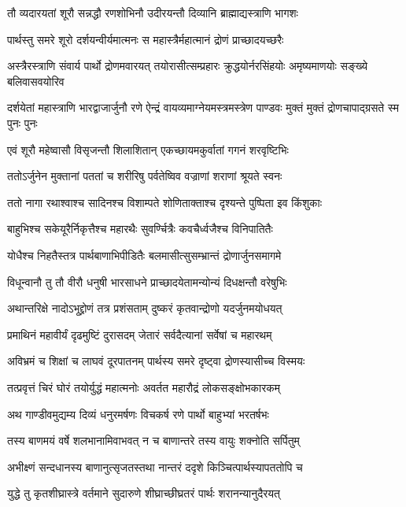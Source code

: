 \twolineshloka
{तौ व्यदारयतां शूरौ सन्नद्धौ रणशोभिनौ}
{उदीरयन्तौ दिव्यानि ब्राह्माद्यस्त्राणि भागशः}


\twolineshloka
{पार्थस्तु समरे शूरो दर्शयन्वीर्यमात्मनः}
{स महास्त्रैर्महात्मानं द्रोणं प्राच्छादयच्छरैः}


\onelineshloka
{अस्त्रैरस्त्राणि संवार्य पार्थो द्रोणमवारयत्}
\twolineshloka
{तयोरासीत्सम्प्रहारः क्रुद्धयोर्नरसिंहयोः}
{अमृष्यमाणयोः सङ्ख्ये बलिवासवयोरिव}


\onelineshloka
{दर्शयेतां महास्त्राणि भारद्वाजार्जुनौ रणे}
\twolineshloka
{ऐन्द्रं वायव्यमाग्नेयमस्त्रमस्त्रेण पाण्डवः}
{मुक्तं मुक्तं द्रोणचापाद्ग्रसते स्म पुनः पुनः}


\twolineshloka
{एवं शूरौ महेष्वासौ विसृजन्तौ शिलाशितान्}
{एकच्छायमकुर्वातां गगनं शरवृष्टिभिः}


\twolineshloka
{ततोऽर्जुनेन मुक्तानां पततां च शरीरिषु}
{पर्वतेष्विव वज्राणां शराणां श्रूयते स्वनः}


\twolineshloka
{ततो नागा रथाश्वाश्च सादिनश्च विशाम्पते}
{शोणिताक्ताश्च दृश्यन्ते पुष्पिता इव किंशुकाः}


\twolineshloka
{बाहुभिश्च सकेयूरैर्निकृत्तैश्च महारथैः}
{सुवर्ण्चित्रैः कवचैर्ध्वजैश्च विनिपातितैः}


\twolineshloka
{योधैश्च निहतैस्तत्र पार्थबाणाभिपीडितैः}
{बलमासीत्सुसम्भ्रान्तं द्रोणार्जुनसमागमे}


\twolineshloka
{विधून्वानौ तु तौ वीरौ धनुषी भारसाधने}
{प्राच्छादयेतामन्योन्यं दिधक्षन्तौ वरेषुभिः}


\twolineshloka
{अथान्तरिक्षे नादोऽभूद्द्रोणं तत्र प्रशंसताम्}
{दुष्करं कृतवान्द्रोणो यदर्जुनमयोधयत्}


\twolineshloka
{प्रमाथिनं महावीर्यं दृढमुष्टिं दुरासदम्}
{जेतारं सर्वदैत्यानां सर्वेषां च महारथम्}


\twolineshloka
{अविभ्रमं च शिक्षां च लाघवं दूरपातनम्}
{पार्थस्य समरे दृष्ट्वा द्रोणस्यासीच्च विस्मयः}


\twolineshloka
{तत्प्रवृत्तं चिरं घोरं तयोर्युद्धं महात्मनोः}
{अवर्तत महारौद्रं लोकसङ्क्षोभकारकम्}


\twolineshloka
{अथ गाण्डीवमुद्यम्य दिव्यं धनुरमर्षणः}
{विचकर्ष रणे पार्थो बाहुभ्यां भरतर्षभः}


\twolineshloka
{तस्य बाणमयं वर्षे शलभानामिवाभवत्}
{न च बाणान्तरे तस्य वायुः शक्नोति सर्पितुम्}


\twolineshloka
{अभीक्ष्णं सन्दधानस्य बाणानुत्सृजतस्तथा}
{नान्तरं ददृशे किञ्चित्पार्थस्यापततोपि च}


\twolineshloka
{युद्धे तु कृतशीघ्रास्त्रे वर्तमाने सुदारुणे}
{शीघ्राच्छीघ्रतरं पार्थः शरानन्यानुदैरयत्}


